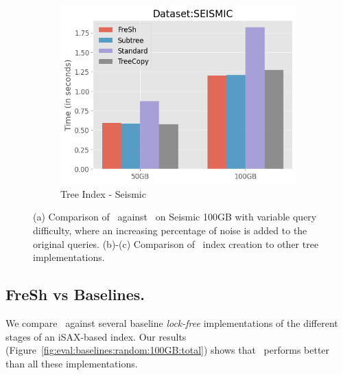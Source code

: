 \begin{figure}[htbp]
    \begin{subfigure}{0.45\textwidth}
        \includegraphics[width=\textwidth]{figures/Experiments/scale-dataset-tree-index-seismic.png}
        \caption{Tree Index - Seismic}
        \label{fig:eval:scale-dataset:tree-index:seismic}
    \end{subfigure}    

    \caption{(a) Comparison of \Fresh\ against \MESSI\ on Seismic 100GB with variable query difficulty, where an increasing percentage of noise is added to the original queries.
    (b)-(c) Comparison of \Fresh\ index creation to other tree implementations.}
    \label{fig:eval:scale-dataset:tree-index}
\end{figure}


\subsection{ FreSh vs Baselines.}
We compare \Fresh\ against several baseline {\em lock-free} implementations of the 
different stages of an iSAX-based index. 
Our results (Figure~\ref{fig:eval:baselines:random:100GB:total})
shows that \Fresh\ performs better than all these implementations.

